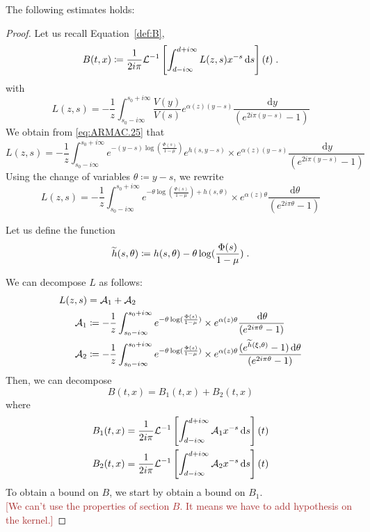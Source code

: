 \documentclass[11pt]{amsart}
\newcommand{\diff}{\,\mathrm{d}}
\newcommand{\ndr}[1]{\textcolor{brown}{[#1]}}
\begin{document}
\begin{lemma} The following estimates holds:
\end{lemma}
\begin{proof}
    Let us recall Equation~\eqref{def:B},  
    \begin{equation*}
        B(t,x) \coloneqq \frac{1}{2i\pi} \Lcal^{-1}\left[\int_{d-i\infty}^{d+i\infty} L(z,s)x^{-s}\diff s \right] (t)
        \eqfinp
    \end{equation*}
with 
\begin{equation*}
    L(z,s) 
    = 
   - \frac{1}{z}\int_{s_0-i\infty}^{s_0+i\infty} \frac{V(y)}{V(s)} e^{ \alpha(z)(y-s)}
   \frac{\diff y}{(e^{2i\pi(y-s)}-1)}
\end{equation*}
We obtain from \eqref{eq:ARMAC.25} that 
\begin{equation*}
    L(z,s) 
    = 
   - \frac{1}{z}\int_{s_0-i\infty}^{s_0+i\infty} e^{-(y-s) \log(\frac{\Phi(s)}{1-\mu})}e^{h(s, y-s)} \times e^{ \alpha(z)(y-s)}
   \frac{\diff y}{(e^{2i\pi(y-s)}-1)}
\end{equation*}
Using the change of variables $\theta \coloneqq y-s$, we rewrite 
\begin{equation*}
    L(z,s) 
    = 
   - \frac{1}{z}\int_{s_0-i\infty}^{s_0+i\infty} e^{-\theta\log(\frac{\Phi(s)}{1-\mu})+ h(s, \theta)} \times e^{ \alpha(z)\theta}
   \frac{\diff \theta}{(e^{2i\pi\theta}-1)}
\end{equation*}

Let us define the function
    \begin{equation*}
        \widetilde h(s, \theta) \coloneqq h(s, \theta) -\theta\log(\frac{\Phi(s)}{1-\mu})
        \; .
    \end{equation*}

We can decompose $L$ as follows:
\begin{align*}
    L(z, s) &= \Acal_1 + \Acal_2 \\
    \Acal_1 
    &\coloneqq    - \frac{1}{z}\int_{s_0-i\infty}^{s_0+i\infty} e^{-\theta\log(\frac{\Phi(s)}{1-\mu})} \times e^{ \alpha(z)\theta}
    \frac{\diff \theta}{(e^{2i\pi\theta}-1)} \\ 
    \Acal_2 &\coloneqq 
    - \frac{1}{z}\int_{s_0-i\infty}^{s_0+i\infty} e^{-\theta\log(\frac{\Phi(s)}{1-\mu})} \times e^{ \alpha(z)\theta}
    \frac{(e^{\tilde h(\xi, \theta)} - 1)\diff \theta}{(e^{2i\pi\theta}-1)}
\end{align*}
Then, we can decompose 
\begin{equation*}
    B(t,x) = B_1(t,x) + B_2(t,x)
\end{equation*}
where
\begin{align*}
    B_1(t,x)
    &= 
    \frac{1}{2i\pi} \Lcal^{-1}\left[\int_{d-i\infty}^{d+i\infty} \Acal_1 x^{-s}\diff s \right] (t)   \\
    B_2(t,x)
    &= 
    \frac{1}{2i\pi} \Lcal^{-1}\left[\int_{d-i\infty}^{d+i\infty} \Acal_2 x^{-s}\diff s \right] (t)    
\end{align*}
To obtain a bound on $B$, we start by obtain a bound on $B_1$. \\
\ndr{We can't use the properties of section $B$. It means we have to add hypothesis on the kernel.}


\end{proof}
\end{document}
